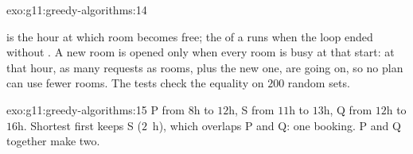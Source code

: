 \begin{solution}{exo:g11:greedy-algorithms:14}
\smallskip\noindent\hspace*{2em}

\noindent\hspace*{4em}

\noindent\hspace*{4em}

\noindent\hspace*{6em}

\noindent\hspace*{8em}

\noindent\hspace*{10em}

\noindent\hspace*{10em}

\noindent\hspace*{6em}

\noindent\hspace*{8em}

\noindent\hspace*{4em}

\smallskip\noindent {} is the hour at which room  becomes free; the  of a 
runs when the loop ended without . A new room is opened only when every room is busy at that start: at that
hour, as many requests as rooms, plus the new one, are going on, so no plan can use fewer rooms. The tests check the
equality on $200$ random sets.
\end{solution}

\begin{solution}{exo:g11:greedy-algorithms:15}
P from $8$h to $12$h, S from $11$h to $13$h, Q from $12$h to $16$h. Shortest first keeps S ($2$~h), which overlaps P and
Q: one booking. P and Q together make two.
\end{solution}

